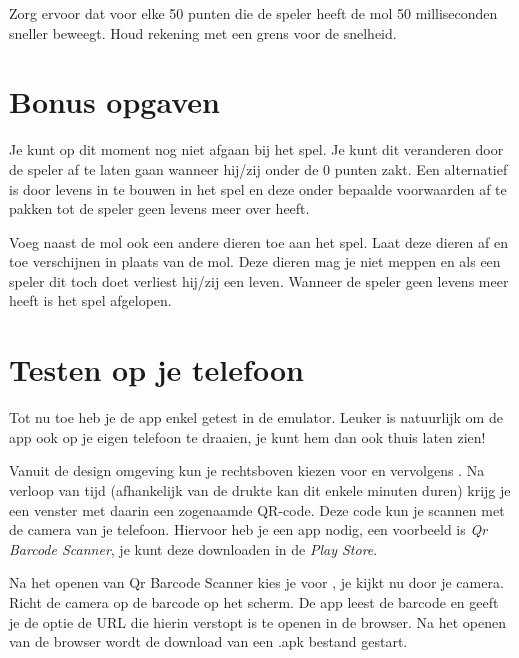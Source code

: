 \begin{opgave}
    \opgVraag
	Zorg ervoor dat voor elke 50 punten die de speler heeft de mol 50 milliseconden sneller beweegt. Houd rekening met een grens voor de snelheid.
\end{opgave}

\section{Bonus opgaven}
Je kunt op dit moment nog niet afgaan bij het spel. Je kunt dit veranderen door de speler af te laten gaan 
wanneer hij/zij onder de 0 punten zakt. Een alternatief is door levens in te bouwen in het spel en deze 
onder bepaalde voorwaarden af te pakken tot de speler geen levens meer over heeft.

\begin{opgave}
    \opgVraag
	Voeg naast de mol ook een andere dieren toe aan het spel. Laat deze dieren af en toe verschijnen in plaats van de mol. Deze dieren mag je niet meppen en als een speler dit toch doet verliest hij/zij een leven. Wanneer de speler geen levens meer heeft is het spel afgelopen.
\end{opgave}

\section{Testen op je telefoon}
\runOpTelefoon{} Tot nu toe heb je de app enkel getest in de emulator. Leuker is natuurlijk om de app ook op je eigen telefoon te draaien, je kunt hem dan ook thuis laten zien!

Vanuit de design omgeving kun je rechtsboven kiezen voor  en vervolgens . Na verloop van tijd (afhankelijk van de drukte kan dit enkele minuten duren) krijg je een venster met daarin een zogenaamde QR-code. Deze code kun je scannen met de camera van je telefoon. Hiervoor heb je een app nodig, een voorbeeld is \emph{Qr Barcode Scanner}, je kunt deze downloaden in de \emph{Play Store}.

Na het openen van Qr Barcode Scanner kies je voor , je kijkt nu door je camera. Richt de camera op de barcode op het scherm. De app leest de barcode en geeft je de optie de URL die hierin verstopt is te openen in de browser. Na het openen van de browser wordt de download van een .apk bestand gestart. 


